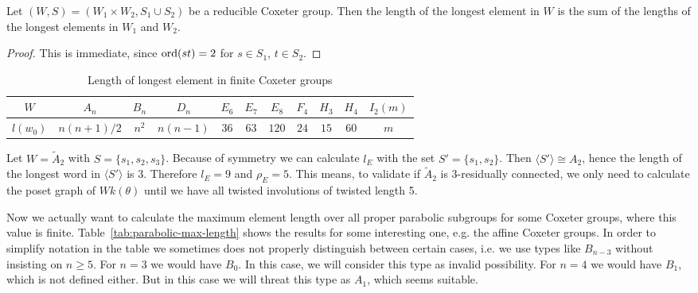 \begin{prop}
	Let $(W,S) = (W_1 \times W_2, S_1 \cup S_2)$ be a reducible Coxeter group. Then the length of the longest element in $W$ is the sum of the lengths of the longest elements in $W_1$ and $W_2$.

	\begin{proof}
		This is immediate, since $\operatorname{ord}(st) = 2$ for $s \in S_1$, $t \in S_2$.
	\end{proof}
\end{prop}

\begin{table}[ht]
	\centering
	\begin{tabular}{|c|cccccccccc|}
		\hline
		$W$ & $A_n$ & $B_n$ & $D_n$ & $E_6$ & $E_7$ & $E_8$ & $F_4$ & $H_3$ & $H_4$ & $I_2(m)$ \\
		\hline
		$l(w_0)$ & $n(n+1)/2$ & $n^2$ & $n(n-1)$ & $36$ & $63$ & $120$ & $24$ & $15$ & $60$ & $m$ \\
		\hline
	\end{tabular}
	\caption{Length of longest element in finite Coxeter groups}
	\label{tab:length-w0}	
\end{table}

\begin{exam}
	Let $W = \tilde A_2$ with $S = \{s_1, s_2, s_3\}$. Because of symmetry we can calculate $l_E$ with the set $S' = \{s_1,s_2\}$. Then $\langle S' \rangle \cong A_2$, hence the length of the longest word in $\langle S' \rangle$ is $3$. Therefore $l_E = 9$ and $\rho_E = 5$. This means, to validate if $\tilde A_2$ is 3-residually connected, we only need to calculate the poset graph of $Wk(\theta)$ until we have all twisted involutions of twisted length 5.
\end{exam}

Now we actually want to calculate the maximum element length over all proper parabolic subgroups for some Coxeter groups, where this value is finite. Table~\ref{tab:parabolic-max-length} shows the results for some interesting one, e.g. the affine Coxeter groups. In order to simplify notation in the table we sometimes does not properly distinguish between certain cases, i.e. we use types like $B_{n-3}$ without insisting on $n \geq 5$. For $n=3$ we would have $B_0$. In this case, we will consider this type as invalid possibility. For $n=4$ we would have $B_1$, which is not defined either. But in this case we will threat this type as $A_1$, which seems suitable.

